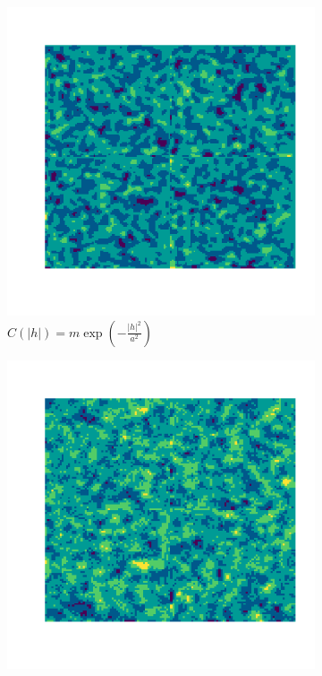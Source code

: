 \documentclass[10pt]{article} %
\begin{document}
\begin{figure}[h!]
    \centering
    \begin{subfigure}[b]{0.3\textwidth}
        \centering
        \includegraphics[width=\textwidth]{media/gauss_2.7_1_1.png}
        \caption{$C(|h|) = m \exp(-\frac{|h|^2}{a^2})$}
        \label{gauss plasma}
    \end{subfigure}
    \hfill
    \begin{subfigure}[b]{0.3\textwidth}
        \centering
        \includegraphics[width=\textwidth]{media/sphere.png}

\end{subfigure}
\end{figure}
\end{document}
